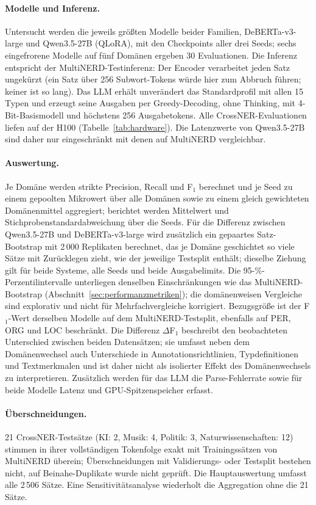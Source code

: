\paragraph{Modelle und Inferenz.}
Untersucht werden die jeweils größten Modelle beider Familien,
DeBERTa-v3-large und Qwen3.5-27B (QLoRA), mit den Checkpoints aller drei
Seeds; sechs eingefrorene Modelle auf fünf Domänen ergeben
30 Evaluationen.
Die Inferenz entspricht der MultiNERD-Testinferenz: Der Encoder
verarbeitet jeden Satz ungekürzt (ein Satz über 256 Subwort-Tokens
würde hier zum Abbruch führen; keiner ist so lang).
Das LLM erhält unverändert das Standardprofil mit allen 15 Typen und
erzeugt seine Ausgaben per Greedy-Decoding, ohne Thinking, mit
4-Bit-Basismodell und höchstens 256 Ausgabetokens.
Alle CrossNER-Evaluationen liefen auf der H100
(Tabelle~\ref{tab:hardware}). Die Latenzwerte von Qwen3.5-27B sind
daher nur eingeschränkt mit denen auf MultiNERD vergleichbar.

\paragraph{Auswertung.}
Je Domäne werden strikte Precision, Recall und F$_1$ berechnet und je Seed
zu einem gepoolten Mikrowert über alle Domänen sowie zu einem gleich
gewichteten Domänenmittel aggregiert; berichtet werden Mittelwert und
Stichprobenstandardabweichung über die Seeds.
Für die Differenz zwischen Qwen3.5-27B und DeBERTa-v3-large wird zusätzlich
ein gepaartes Satz-Bootstrap mit 2\,000 Replikaten berechnet, das je
Domäne geschichtet so viele Sätze mit Zurücklegen zieht, wie der
jeweilige Testsplit enthält; dieselbe Ziehung gilt für beide Systeme,
alle Seeds und beide Ausgabelimits.
Die 95-\%-Perzentilintervalle unterliegen denselben Einschränkungen wie
das MultiNERD-Bootstrap (Abschnitt~\ref{sec:performanzmetriken}); die
domänenweisen Vergleiche sind explorativ und nicht für Mehrfachvergleiche
korrigiert.
Bezugsgröße ist der F$_1$-Wert derselben Modelle auf dem MultiNERD-Testsplit,
ebenfalls auf PER, ORG und LOC beschränkt.
Die Differenz $\Delta$F$_1$ beschreibt den beobachteten Unterschied zwischen
beiden Datensätzen; sie umfasst neben dem Domänenwechsel auch
Unterschiede in Annotationsrichtlinien, Typdefinitionen und
Textmerkmalen und ist daher nicht als isolierter Effekt des
Domänenwechsels zu interpretieren.
Zusätzlich werden für das LLM die Parse-Fehlerrate sowie für beide
Modelle Latenz und GPU-Spitzenspeicher erfasst.

\paragraph{Überschneidungen.}
21 CrossNER-Testsätze (KI: 2, Musik: 4, Politik: 3,
Naturwissenschaften: 12) stimmen in ihrer vollständigen Tokenfolge exakt
mit Trainingssätzen von MultiNERD überein; Überschneidungen mit
Validierungs- oder Testsplit bestehen nicht, auf Beinahe-Duplikate wurde
nicht geprüft.
Die Hauptauswertung umfasst alle 2\,506 Sätze. Eine Sensitivitätsanalyse
wiederholt die Aggregation ohne die 21 Sätze.

